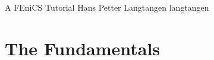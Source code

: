 
\newcommand{\langtangenrefeq}[1]{(\ref{#1})}
\newcommand{\langtangenep}{\thinspace . }

\newcommand{\langtangenmathbfx}[1]{{\mbox{\boldmath $#1$}}}
\newcommand{\langtangenxpoint}{\langtangenmathbfx{x}}
\newcommand{\langtangennormalvec}{\langtangenmathbfx{n}}

\newcommand{\langtangencodett}[1]{{\rm\texttt{#1}}}

\newcommand{\langtangenidx}[1]{\index{#1@\langtangencodett{#1}}}


              {A FEniCS Tutorial}
              {Hans Petter Langtangen}
              {langtangen}

\label{langtangen:main}

\newcommand{\hpl}[1]{}


\section{The Fundamentals}
\label{langtangen:fundamentals}

